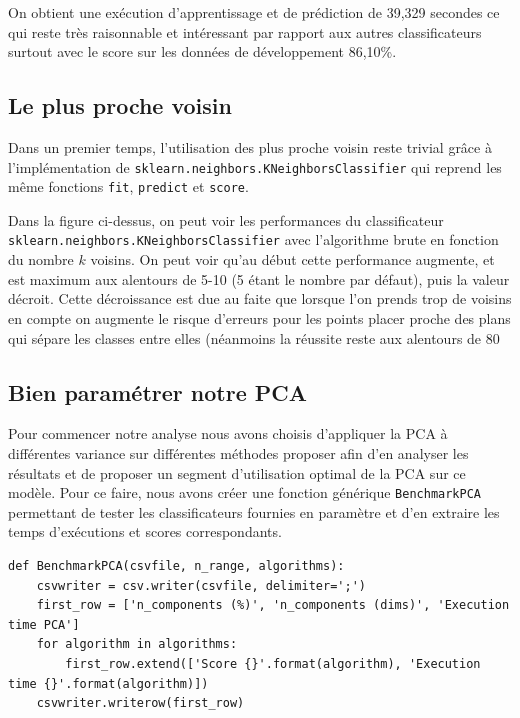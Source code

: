 \documentclass[12pt,a4paper]{article}
\begin{document}
{On obtient une exécution d'apprentissage et de prédiction de 39,329 secondes ce qui reste très raisonnable et intéressant par rapport aux autres classificateurs surtout avec le score sur les données de développement 86,10\%.

\subsection{Le plus proche voisin}

Dans un premier temps, l'utilisation des plus proche voisin reste trivial grâce à l'implémentation de \lstinline[style=default]|sklearn.neighbors.KNeighborsClassifier| qui reprend les même fonctions \lstinline[style=default]|fit|, \lstinline[style=default]|predict| et  \lstinline[style=default]|score|.

Dans la figure ci-dessus, on peut voir les performances du classificateur \lstinline[style=default]|sklearn.neighbors.KNeighborsClassifier| avec l'algorithme brute en fonction du nombre $k$ voisins. On peut voir qu'au début cette performance augmente, et est maximum aux alentours de 5-10 (5 étant le nombre par défaut), puis la valeur décroit. Cette décroissance est due au faite que lorsque l'on prends trop de voisins en compte on augmente le risque d'erreurs pour les points placer proche des plans qui sépare les classes entre elles (néanmoins la réussite reste aux alentours de 80%


\subsection{Bien paramétrer notre PCA}

Pour commencer notre analyse nous avons choisis d'appliquer la PCA à différentes variance sur différentes méthodes proposer afin d'en analyser les résultats et de proposer un segment d'utilisation optimal de la PCA sur ce modèle. Pour ce faire, nous avons créer une fonction générique \lstinline[style=default]|BenchmarkPCA| permettant de tester les classificateurs fournies en paramètre et d'en extraire les temps d'exécutions et scores correspondants.
\begin{lstlisting}[style=darkula]
def BenchmarkPCA(csvfile, n_range, algorithms):
	csvwriter = csv.writer(csvfile, delimiter=';')
	first_row = ['n_components (%)', 'n_components (dims)', 'Execution time PCA']
	for algorithm in algorithms:
		first_row.extend(['Score {}'.format(algorithm), 'Execution time {}'.format(algorithm)])
	csvwriter.writerow(first_row)


\end{lstlisting}}
\end{document}
